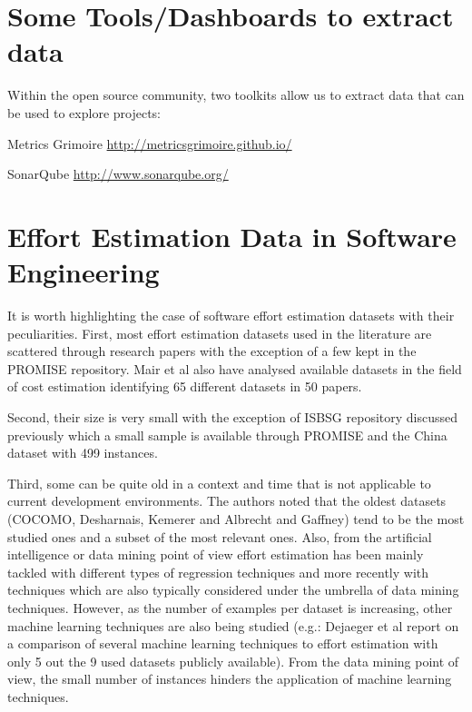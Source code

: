 \documentclass[]{book}
\begin{document}
\section{Some Tools/Dashboards to extract
data}\label{some-toolsdashboards-to-extract-data}

Within the open source community, two toolkits allow us to extract data
that can be used to explore projects:

Metrics Grimoire \url{http://metricsgrimoire.github.io/}

SonarQube \url{http://www.sonarqube.org/}

\section{Effort Estimation Data in Software
Engineering}\label{effort-estimation-data-in-software-engineering}

It is worth highlighting the case of software effort estimation datasets
with their peculiarities. First, most effort estimation datasets used in
the literature are scattered through research papers with the exception
of a few kept in the PROMISE repository. Mair et al
\citeyearpar{MairSJ05} also have analysed available datasets in the
field of cost estimation identifying 65 different datasets in 50 papers.

Second, their size is very small with the exception of ISBSG repository
discussed previously which a small sample is available through PROMISE
and the China dataset with 499 instances.

Third, some can be quite old in a context and time that is not
applicable to current development environments. The authors noted that
the oldest datasets (COCOMO, Desharnais, Kemerer and Albrecht and
Gaffney) tend to be the most studied ones and a subset of the most
relevant ones. Also, from the artificial intelligence or data mining
point of view effort estimation has been mainly tackled with different
types of regression techniques and more recently with techniques which
are also typically considered under the umbrella of data mining
techniques. However, as the number of examples per dataset is
increasing, other machine learning techniques are also being studied
(e.g.: Dejaeger et al \citeyearpar{Dejaeger_TSE12_EffEst} report on a
comparison of several machine learning techniques to effort estimation
with only 5 out the 9 used datasets publicly available). From the data
mining point of view, the small number of instances hinders the
application of machine learning techniques.
\end{document}
